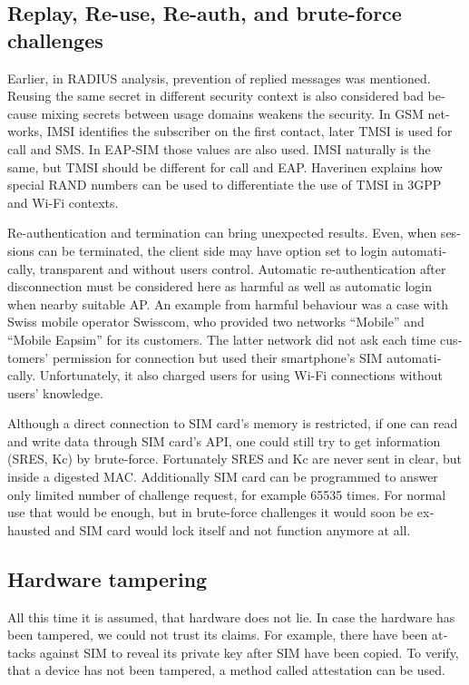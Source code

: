 \documentclass[12pt,a4paper,english]{tutthesis}
\begin{document}
\begin{otherlanguage}{english}
\subsection{Replay, Re-use, Re-auth, and brute-force challenges}
\label{sec-6-1-5}

Earlier, in RADIUS analysis, prevention of replied messages was
mentioned. Reusing the same secret in different security context is also
considered bad because mixing secrets between usage
domains weakens the security.  In GSM networks, IMSI identifies the subscriber on
the first contact, later TMSI is used for call and SMS.  In EAP-SIM those
values are also used. IMSI naturally is the same, but TMSI should be
different for call and EAP.  Haverinen\cite{hav-doc} explains how
special RAND numbers can be used to differentiate the use of TMSI in 3GPP and Wi-Fi
contexts.

Re-authentication and termination can bring unexpected results.
Even, when sessions can be terminated, the client side may have 
option set to login automatically, transparent and without users control.
Automatic re-authentication after disconnection  must be considered
here as harmful as well as automatic login when nearby suitable AP. An
example from harmful behaviour was a case with  Swiss mobile operator Swisscom, who
 provided two networks ``Mobile'' and ``Mobile Eapsim''  for its
customers. 
The latter network did not ask each time customers' permission for
connection but used their smartphone's SIM
automatically. Unfortunately, it also charged users for using Wi-Fi
connections without users' knowledge.\cite{swisscom}



Although a direct connection to SIM card's memory is restricted,
if one can read and write data through SIM card's API,
one could still try to get information (SRES, Kc) by brute-force. 
Fortunately SRES and Kc are never sent in clear, but inside
a digested MAC.
 Additionally SIM card can be programmed to answer only
limited number of challenge request, for example 65535 times.
For normal use that would be enough, but in brute-force challenges 
it would soon be exhausted and SIM card would lock itself and not
function anymore at all.


\subsection{Hardware tampering}
\label{sec-6-1-6}
All this time it is assumed, that hardware does not lie. In case
the hardware has been tampered, we could not trust its claims.
For example, there have been attacks against SIM to reveal its private
key after SIM have been copied.  To verify, that a device has not been
tampered, a method called attestation can be used.


\end{otherlanguage}
\end{document}
